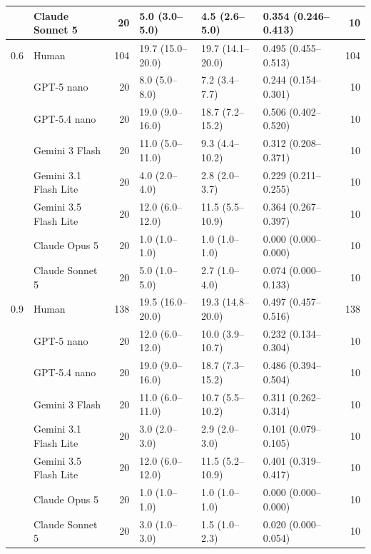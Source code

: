 \documentclass{article}
\begin{document}
\begin{table}[t]
\begin{tabular}{@{}llrlllr@{}}
         & Claude Sonnet 5 & 20 & 5.0 (3.0--5.0) & 4.5 (2.6--5.0) & 0.354 (0.246--0.413) & 10 \\
        \midrule
        0.6 & Human & 104 & 19.7 (15.0--20.0) & 19.7 (14.1--20.0) & 0.495 (0.455--0.513) & 104 \\
         & GPT-5 nano & 20 & 8.0 (5.0--8.0) & 7.2 (3.4--7.7) & 0.244 (0.154--0.301) & 10 \\
         & GPT-5.4 nano & 20 & 19.0 (9.0--16.0) & 18.7 (7.2--15.2) & 0.506 (0.402--0.520) & 10 \\
         & Gemini 3 Flash & 20 & 11.0 (5.0--11.0) & 9.3 (4.4--10.2) & 0.312 (0.208--0.371) & 10 \\
         & Gemini 3.1 Flash Lite & 20 & 4.0 (2.0--4.0) & 2.8 (2.0--3.7) & 0.229 (0.211--0.255) & 10 \\
         & Gemini 3.5 Flash Lite & 20 & 12.0 (6.0--12.0) & 11.5 (5.5--10.9) & 0.364 (0.267--0.397) & 10 \\
         & Claude Opus 5 & 20 & 1.0 (1.0--1.0) & 1.0 (1.0--1.0) & 0.000 (0.000--0.000) & 10 \\
         & Claude Sonnet 5 & 20 & 5.0 (1.0--5.0) & 2.7 (1.0--4.0) & 0.074 (0.000--0.133) & 10 \\
        \midrule
        0.9 & Human & 138 & 19.5 (16.0--20.0) & 19.3 (14.8--20.0) & 0.497 (0.457--0.516) & 138 \\
         & GPT-5 nano & 20 & 12.0 (6.0--12.0) & 10.0 (3.9--10.7) & 0.232 (0.134--0.304) & 10 \\
         & GPT-5.4 nano & 20 & 19.0 (9.0--16.0) & 18.7 (7.3--15.2) & 0.486 (0.394--0.504) & 10 \\
         & Gemini 3 Flash & 20 & 11.0 (6.0--11.0) & 10.7 (5.5--10.2) & 0.311 (0.262--0.314) & 10 \\
         & Gemini 3.1 Flash Lite & 20 & 3.0 (2.0--3.0) & 2.9 (2.0--3.0) & 0.101 (0.079--0.105) & 10 \\
         & Gemini 3.5 Flash Lite & 20 & 12.0 (6.0--12.0) & 11.5 (5.2--10.9) & 0.401 (0.319--0.417) & 10 \\
         & Claude Opus 5 & 20 & 1.0 (1.0--1.0) & 1.0 (1.0--1.0) & 0.000 (0.000--0.000) & 10 \\
         & Claude Sonnet 5 & 20 & 3.0 (1.0--3.0) & 1.5 (1.0--2.3) & 0.020 (0.000--0.054) & 10 \\
        \bottomrule
    \end{tabular}
\end{table}
\end{document}
